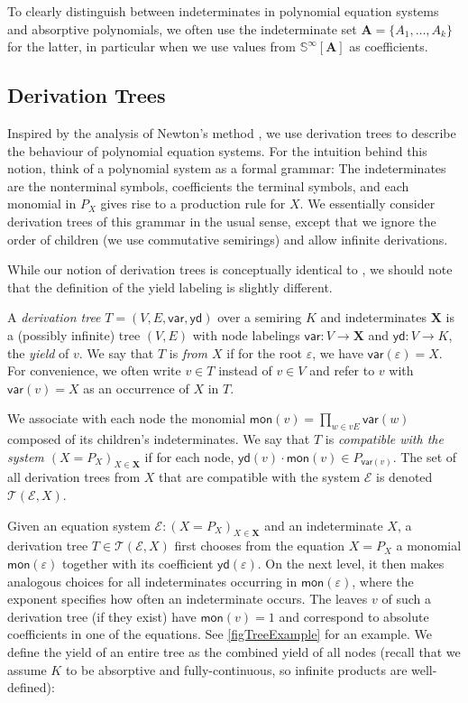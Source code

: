 \documentclass[english,runningheads,a4paper,envcountsame]{llncs}
\newenvironment{Definition}{\definition\upshape}{\enddefinition}
\newcommand{\Sinf}{{\mathbb S}^{\infty}}
\newcommand*{\XX}{{\bm X}}
\newcommand*{\EE}{\mathcal{E}}
\renewcommand{\AA}{{\bm A}}
\renewcommand*{\root}{\varepsilon}
\newcommand*{\yield}{\mathsf{yd}}
\newcommand*{\mon}{\mathsf{mon}}
\newcommand*{\var}{\mathsf{var}}
\newcommand*{\Trees}{\mathcal{T}}
\newcommand*{\co}{\colon}
\begin{document}
To clearly distinguish between indeterminates in polynomial equation systems and absorptive polynomials, we often use the indeterminate set $\AA = \{ A_1,\dots,A_k \}$ for the latter, in particular when we use values from $\Sinf[\AA]$ as coefficients.



\subsection{Derivation Trees}

Inspired by the analysis of Newton's method \cite{Newton}, we use derivation trees to describe the behaviour of polynomial equation systems.
For the intuition behind this notion, think of a polynomial system as a formal grammar:
The indeterminates are the nonterminal symbols, coefficients the terminal symbols, and each monomial in $P_X$ gives rise to a production rule for $X$.
We essentially consider derivation trees of this grammar in the usual sense, except that we ignore the order of children (we use commutative semirings) and allow infinite derivations.

While our notion of derivation trees is conceptually identical to \cite{Newton}, we should note that the definition of the yield labeling is slightly different.


\begin{Definition}\label{defTree}
A \emph{derivation tree} $T = (V, E, \var, \yield)$ over a semiring $K$ and indeterminates $\XX$ is a (possibly infinite) tree $(V,E)$ with node labelings
$\var \co V \to \XX$
and
$\yield \co V \to K$, the \emph{yield} of $v$.
%
We say that $T$ is \emph{from $X$} if for the root $\root$, we have $\var(\root) = X$.
For convenience, we often write $v \in T$ instead of $v \in V$
and refer to $v$ with $\var(v)=X$ as an occurrence of $X$ in $T$.

We associate with each node the monomial $\mon(v) = \prod_{w \in vE} \var(w)$ composed of its children's indeterminates.
We say that $T$ is \emph{compatible with the system $(X = P_X)_{X \in \XX}$} if for each node,
$\yield(v) \cdot \mon(v) \in P_{\var(v)}$.
%
The set of all derivation trees from $X$ that are compatible with the system $\EE$ is denoted $\Trees(\EE, X)$.
\end{Definition}

Given an equation system $\EE \co (X = P_X)_{X \in \XX}$ and an indeterminate $X$, a derivation tree $T \in \Trees(\EE, X)$ first chooses from the equation $X = P_X$ a monomial $\mon(\root)$ together with its coefficient $\yield(\root)$.
On the next level, it then makes analogous choices for all indeterminates occurring in $\mon(\root)$, where the exponent specifies how often an indeterminate occurs.
The leaves $v$ of such a derivation tree (if they exist) have $\mon(v) = 1$ and correspond to absolute coefficients in one of the equations.
See \cref{figTreeExample} for an example.
We define the yield of an entire tree as the combined yield of all nodes (recall that we assume $K$ to be absorptive and fully-continuous, so infinite products are well-defined):
\end{document}
